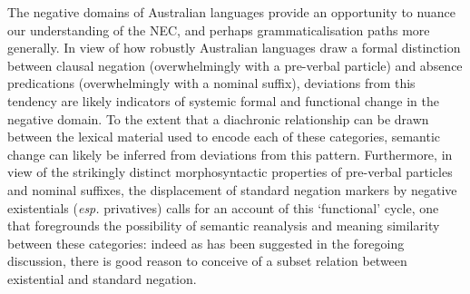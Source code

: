%
%
%


The negative domains of Australian languages provide an opportunity to nuance our understanding of the \acrshort{NEC}, and perhaps grammaticalisation paths more generally. In view of how robustly Australian languages draw a formal distinction between clausal negation (overwhelmingly with a pre-verbal particle) and absence predications (overwhelmingly with a nominal suffix), deviations from this tendency are likely indicators of systemic formal and functional change in the negative domain. To the extent that a diachronic relationship can be drawn between the lexical material used to encode each of these categories, semantic change can likely be inferred from deviations from this pattern. Furthermore, in view of the strikingly distinct morphosyntactic properties of pre-verbal particles and nominal suffixes, the displacement of standard negation markers by negative existentials (\textit{esp.} privatives) calls for an account of this `functional' cycle, one that foregrounds the possibility of semantic reanalysis and meaning similarity between these categories: indeed as has been suggested in the foregoing discussion, there is good reason to conceive of a subset relation between existential and standard negation. 


